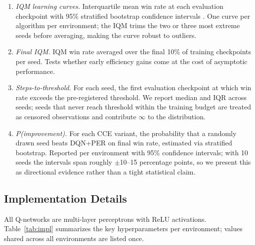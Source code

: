 \documentclass[conference]{IEEEtran}
\begin{document}
\begin{enumerate}
    \item \emph{IQM learning curves.} Interquartile mean win rate at each evaluation checkpoint with 95\% stratified bootstrap confidence intervals \cite{agarwal2021deep}. One curve per algorithm per environment; the IQM trims the two or three most extreme seeds before averaging, making the curve robust to outliers.

    \item \emph{Final IQM.} IQM win rate averaged over the final 10\% of training checkpoints per seed. Tests whether early efficiency gains come at the cost of asymptotic performance.

    \item \emph{Steps-to-threshold.} For each seed, the first evaluation checkpoint at which win rate exceeds the pre-registered threshold. We report median and IQR across seeds; seeds that never reach threshold within the training budget are treated as censored observations and contribute $\infty$ to the distribution.

    \item \emph{P(improvement).} For each CCE variant, the probability that a randomly drawn seed beats DQN+PER on final win rate, estimated via stratified bootstrap. Reported per environment with 95\% confidence intervals; with 10 seeds the intervals span roughly $\pm$10--15 percentage points, so we present this as directional evidence rather than a tight statistical claim.
\end{enumerate}

\subsection{Implementation Details}

\noindent All Q-networks are multi-layer perceptrons with ReLU activations. Table~\ref{tab:impl} summarizes the key hyperparameters per environment; values shared across all environments are listed once.
\end{document}
